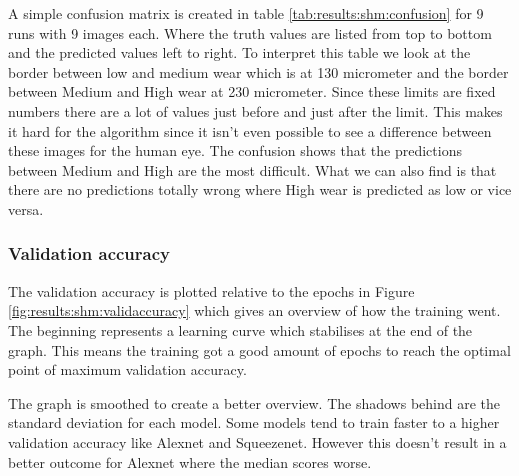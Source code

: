 		A simple confusion matrix is created in table \ref{tab:results:shm:confusion} for 9 runs with 9 images each. Where the truth values are listed from top to bottom and the predicted values left to right.
	To interpret this table we look at the border between low and medium wear which is at 130 micrometer and the border between Medium and High wear at 230 micrometer. Since these limits are fixed numbers there are a lot of values just before and just after the limit. This makes it hard for the algorithm since it isn't even possible to see a difference between these images for the human eye. The confusion shows that the predictions between Medium and High are the most difficult. What we can also find is that there are no predictions totally wrong where High wear is predicted as low or vice versa.
	


	\subsubsection{Validation accuracy}
		The validation accuracy is plotted relative to the epochs in Figure \ref{fig:results:shm:validaccuracy} which gives an overview of how the training went. The beginning represents a learning curve which stabilises at the end of the graph. This means the training got a good amount of epochs to reach the optimal point of maximum validation accuracy.

		The graph is smoothed to create a better overview. The shadows behind are the standard deviation for each model. Some models tend to train faster to a higher validation accuracy like Alexnet and Squeezenet. However this doesn't result in a better outcome for Alexnet where the median scores worse. 

